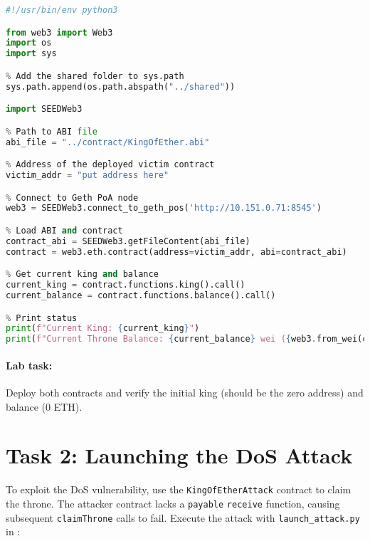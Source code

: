 \begin{lstlisting}[language=python, caption={Checking contract state (\texttt{check\_status.py})}]
#!/usr/bin/env python3

from web3 import Web3
import os
import sys

% Add the shared folder to sys.path
sys.path.append(os.path.abspath("../shared"))

import SEEDWeb3

% Path to ABI file
abi_file = "../contract/KingOfEther.abi"

% Address of the deployed victim contract
victim_addr = "put address here"

% Connect to Geth PoA node
web3 = SEEDWeb3.connect_to_geth_pos('http://10.151.0.71:8545')

% Load ABI and contract
contract_abi = SEEDWeb3.getFileContent(abi_file)
contract = web3.eth.contract(address=victim_addr, abi=contract_abi)

% Get current king and balance
current_king = contract.functions.king().call()
current_balance = contract.functions.balance().call()

% Print status
print(f"Current King: {current_king}")
print(f"Current Throne Balance: {current_balance} wei ({web3.from_wei(current_balance, 'ether')} ETH)")
\end{lstlisting}

\paragraph{Lab task:} Deploy both contracts and verify the initial king (should be the zero address) and balance (0 ETH).

\section{Task 2: Launching the DoS Attack}

To exploit the DoS vulnerability, use the \texttt{KingOfEtherAttack} contract to claim the throne. The attacker contract lacks a \texttt{payable} \texttt{receive} function, causing subsequent \texttt{claimThrone} calls to fail. Execute the attack with \texttt{launch\_attack.py} in :

